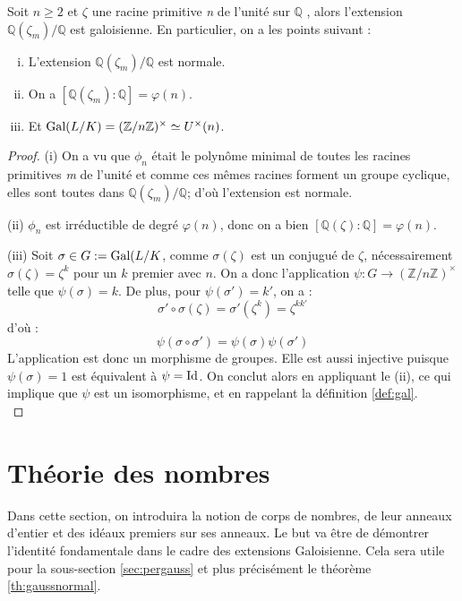 \documentclass[a4paper]{article} %
\numberwithin{section}{part}
\numberwithin{equation}{section}
\newcommand\nroot[1]{\textit{#1}\up{\textit{ième}}}
\newcommand\zmodninv[1]{(\mathbb{Z}/#1\mathbb{Z})^{\times}}
\newcommand\QQ{\mathbb{Q}}
\begin{document}
\begin{prop}
Soit $n \geq 2$ et $\zeta$ une racine primitive \nroot{n} de l'unité sur $\QQ$
, alors l'extension $\QQ(\zeta_m)/\QQ$ est galoisienne. En particulier, on a 
les points suivant :

\begin{enumerate}[(i)]
\item L'extension $\QQ(\zeta_m)/\QQ$ est normale.

\item On a $[\QQ(\zeta_m):\QQ] = \varphi(n)$.

\item Et $\textup{Gal}(L/K) = \zmodninv{n} \simeq U^{\times}(n)$.
\end{enumerate}
\end{prop}
\begin{proof}
(i) On a vu que $\phi_n$ était le polynôme minimal de toutes les racines 
primitives \nroot{m} de l'unité et comme ces mêmes racines forment un groupe 
cyclique, elles sont toutes dans $\QQ(\zeta_m)/\QQ$; d'où l'extension est
normale.\par
(ii) $\phi_n$ est irréductible de degré $\varphi(n)$, donc on a bien
$[\QQ(\zeta):\QQ] = \varphi(n)$.\par
(iii) Soit $\sigma\in G := \textup{Gal}(L/K$, comme $\sigma(\zeta)$ est un
conjugué de $\zeta$, nécessairement $\sigma(\zeta) = \zeta^k$ pour un $k$
premier avec $n$. On a donc l'application $\psi : G \to \zmodninv{n}$ telle que
$\psi(\sigma) = k$. De plus, pour $\psi(\sigma') = k'$, on a :
\[\sigma'\circ\sigma(\zeta) = \sigma'(\zeta^k) = \zeta^{kk'}\]
d'où :
\[\psi(\sigma\circ\sigma') = \psi(\sigma)\psi(\sigma')\]
L'application est donc un morphisme de groupes. Elle est aussi injective puisque
$\psi(\sigma) = 1$ est équivalent à $\psi = \textup{Id}$. On conclut alors en
appliquant le (ii), ce qui implique que $\psi$ est un isomorphisme, et en 
rappelant la définition \ref{def:gal}.\\
\end{proof}

\section{Théorie des nombres}
Dans cette section, on introduira la notion de corps de nombres, de leur
anneaux d'entier et des idéaux premiers sur ses anneaux. Le but va être de 
démontrer l'identité fondamentale dans le cadre des extensions Galoisienne. 
Cela sera utile pour la sous-section \ref{sec:pergauss} et plus précisément le 
théorème \ref{th:gaussnormal}.
\end{document}
